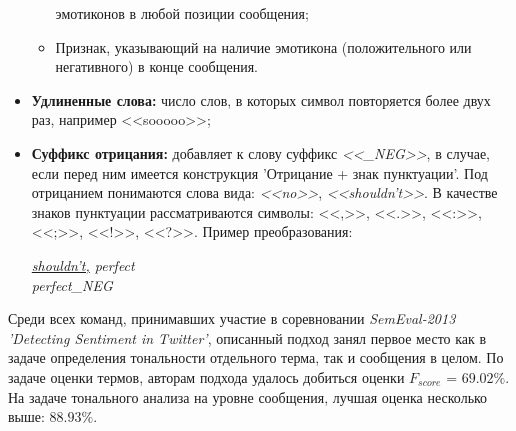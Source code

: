 \begin{itemize}
\begin{itemize}
                    эмотиконов в любой позиции сообщения;
                \item Признак, указывающий на наличие эмотикона (положительного
                    или негативного) в конце сообщения.
            \end{itemize}
        \item {\bf Удлиненные слова:} число слов, в которых символ повторяется
            более двух раз, например <<sooooo>>;
        \item {\bf Суффикс отрицания:} добавляет к слову суффикс {\it <<\_NEG>>},
            в случае, если перед ним имеется конструкция 'Отрицание +
            знак пунктуации'.
            Под отрицанием понимаются слова вида: {\it<<no>>}, {\it <<shouldn't>>}.
            В качестве знаков пунктуации рассматриваются символы:
            <<,>>, <<.>>, <<:>>, <<;>>, <<!>>, <<?>>.
            Пример преобразования:
            \begin{center}
                \it
                \underline{shouldn't,} perfect \\
                perfect\_NEG
            \end{center}
    \end{itemize}

    Среди всех команд, принимавших участие в соревновании {\it SemEval-2013 'Detecting
    Sentiment in Twitter'}, описанный подход занял первое место как в задаче
    определения тональности отдельного терма, так и сообщения в целом.
    По задаче оценки термов, авторам подхода удалось добиться оценки
    $F_{score}$ = $69.02\%$. На задаче тонального анализа на уровне сообщения,
    лучшая оценка несколько выше: $88.93\%$.
